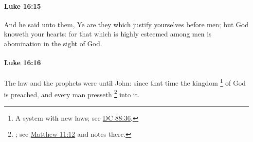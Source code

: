 		\paragraph{Luke 16:15} %
			\label{LUKE-16-15}

			And he said unto them, Ye are they which justify yourselves before men; but God knoweth your hearts: for that which is highly esteemed among men is abomination in the sight of God.

			\begin{framed}
			\scriptsize
				\begin{compactdesc}
					\item[SBLG] 
				\end{compactdesc}
			\end{framed}

		\paragraph{Luke 16:16} %
			\label{LUKE-16-16}

			The law and the prophets were until John: since that time the kingdom%
				\footnote{%
					A system with new laws; see \hyperref[DC88-36]{DC 88:36}.
					}
			of God is preached, and every man presseth%
				\footnote{%
					; see \hyperref[MATTHEW-11-12]{Matthew 11:12} and notes there.
					}
			into it.

